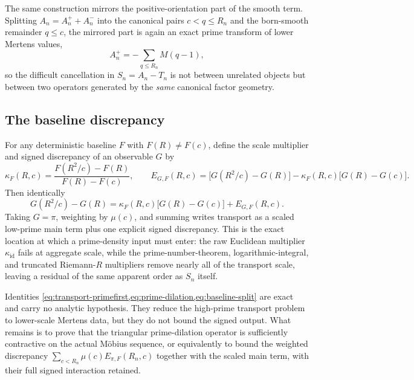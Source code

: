The same construction mirrors the positive-orientation part of the smooth term.  Splitting $A_n=A_n^++A_n^-$ into the canonical pairs $c<q\le R_n$ and the born-smooth remainder $q\le c$, the mirrored part is again an exact prime transform of lower Mertens values,
\begin{equation}
 A_n^+=-\sum_{q\le R_n}M(q-1),
 \label{eq:A-plus-primeform}
\end{equation}
so the difficult cancellation in $S_n=A_n-T_n$ is not between unrelated objects but between two operators generated by the \emph{same} canonical factor geometry.

\subsection{The baseline discrepancy}

For any deterministic baseline $F$ with $F(R)\ne F(c)$, define the scale multiplier and signed discrepancy of an observable $G$ by
\begin{equation}
 \kappa_F(R,c)=\frac{F(R^2/c)-F(R)}{F(R)-F(c)},
 \qquad
 E_{G,F}(R,c)=\bigl[G(R^2/c)-G(R)\bigr]-\kappa_F(R,c)\bigl[G(R)-G(c)\bigr].
 \label{eq:baseline-discrepancy}
\end{equation}
Then identically
\begin{equation}
 G(R^2/c)-G(R)=\kappa_F(R,c)\bigl[G(R)-G(c)\bigr]+E_{G,F}(R,c).
 \label{eq:baseline-split}
\end{equation}
Taking $G=\pi$, weighting by $\mu(c)$, and summing writes transport as a scaled low-prime main term plus one explicit signed discrepancy.  This is the exact location at which a prime-density input must enter: the raw Euclidean multiplier $\kappa_{\mathrm{id}}$ fails at aggregate scale, while the prime-number-theorem, logarithmic-integral, and truncated Riemann-$R$ multipliers remove nearly all of the transport scale, leaving a residual of the same apparent order as $S_n$ itself.

\begin{remark}
\label{rem:scaling-not-bound}
Identities \cref{eq:transport-primefirst,eq:prime-dilation,eq:baseline-split} are exact and carry no analytic hypothesis.  They reduce the high-prime transport problem to lower-scale Mertens data, but they do not bound the signed output.  What remains is to prove that the triangular prime-dilation operator is sufficiently contractive on the actual M\"obius sequence, or equivalently to bound the weighted discrepancy $\sum_{c<R_n}\mu(c)E_{\pi,F}(R_n,c)$ together with the scaled main term, with their full signed interaction retained.
\end{remark}


